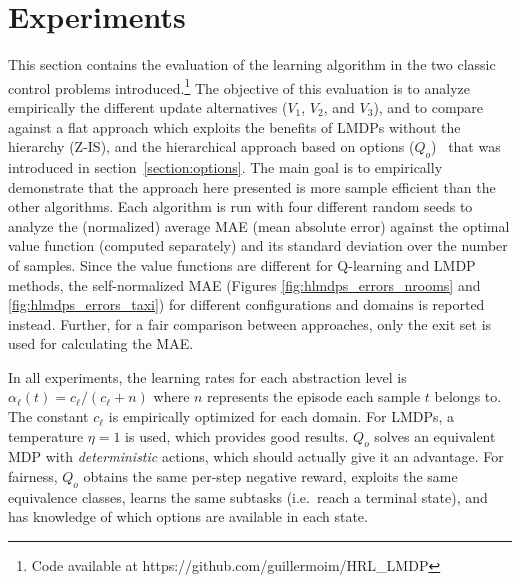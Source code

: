 \section{Experiments}
\label{section:hlmdps_experiments}
This section contains the evaluation of the learning algorithm in the two classic control problems introduced.\footnote{Code available at https://github.com/guillermoim/HRL\_LMDP}
The objective of this evaluation is to analyze empirically the different update alternatives ($V_1$, $V_2$, and $V_3$), and
to compare against a flat approach which exploits the benefits of LMDPs without the hierarchy (Z-IS), and the hierarchical approach based on options ($Q_o$)~\citep{Sutton1999} that was introduced in section~\ref{section:options}. The main goal is to empirically demonstrate that the approach here presented is more sample efficient than the other algorithms. Each algorithm is run with four different random seeds to analyze the (normalized) average MAE (mean absolute error) against the optimal value function (computed separately) and its standard deviation over the number of samples. Since the value functions are different for Q-learning and LMDP methods, the self-normalized MAE (Figures \ref{fig:hlmdps_errors_nrooms} and \ref{fig:hlmdps_errors_taxi}) for different configurations and domains is reported instead. Further, for a fair comparison between approaches, only the exit set is used for calculating the MAE.


In all experiments, the learning rates for each abstraction level is $\alpha_\ell(t) = c_\ell / (c_\ell + n)$ where $n$ represents the episode each sample $t$ belongs to. The constant $c_\ell$ is empirically optimized for each domain. For LMDPs, a temperature $\eta=1$ is used, which provides good results. $Q_o$ solves an equivalent MDP with {\em deterministic} actions, which should actually give it an advantage. For fairness, $Q_o$ obtains the same per-step negative reward, exploits the same equivalence classes, learns the same subtasks (i.e.~reach a terminal state), and has knowledge of which options are available in each state.

